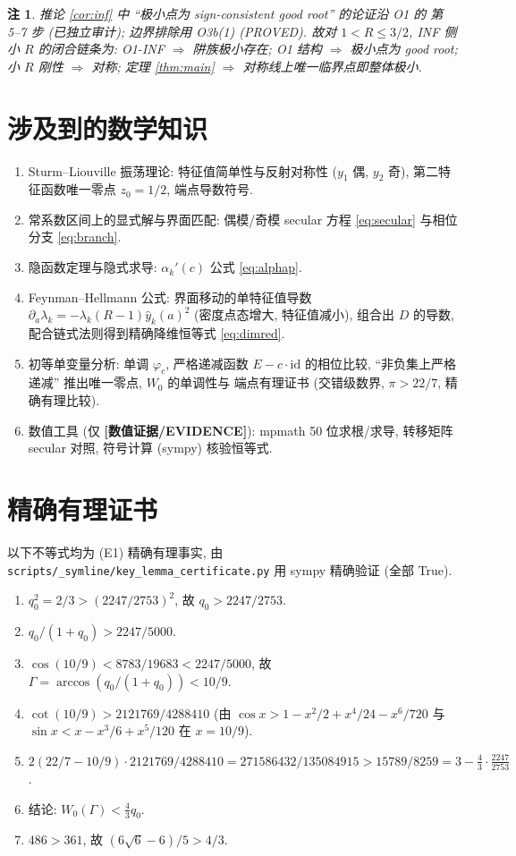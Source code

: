 \documentclass[UTF8]{ctexart}
\newtheorem{remark}[theorem]{注}
\newcommand{\EVID}{\textbf{[数值证据/EVIDENCE]}}
\begin{document}
\begin{remark}
推论 \ref{cor:inf} 中 ``极小点为 sign-consistent good root'' 的论证沿 O1 的
第 5--7 步 (已独立审计); 边界排除用 O3b(1) (PROVED). 故对 $1<R\le3/2$,
INF 侧小 $R$ 的闭合链条为: O1-INF $\Rightarrow$ 阱族极小存在;
O1 结构 $\Rightarrow$ 极小点为 good root; 小 $R$ 刚性 $\Rightarrow$ 对称;
定理 \ref{thm:main} $\Rightarrow$ 对称线上唯一临界点即整体极小.
\end{remark}

\section{涉及到的数学知识}

\begin{enumerate}
	\item Sturm--Liouville 振荡理论: 特征值简单性与反射对称性 ($y_1$ 偶, $y_2$ 奇),
		第二特征函数唯一零点 $z_0=1/2$, 端点导数符号.
	\item 常系数区间上的显式解与界面匹配: 偶模/奇模 secular 方程
		\eqref{eq:secular} 与相位分支 \eqref{eq:branch}.
	\item 隐函数定理与隐式求导: $\alpha_k'(c)$ 公式 \eqref{eq:alphap}.
	\item Feynman--Hellmann 公式: 界面移动的单特征值导数
		$\partial_a\lambda_k=-\lambda_k(R-1)\hat y_k(a)^2$ (密度点态增大, 特征值减小), 组合出 $D$ 的导数,
		配合链式法则得到精确降维恒等式 \eqref{eq:dimred}.
	\item 初等单变量分析: 单调 $\varphi_c$, 严格递减函数 $E-c\cdot\mathrm{id}$
		的相位比较, ``非负集上严格递减'' 推出唯一零点, $W_0$ 的单调性与
		端点有理证书 (交错级数界, $\pi>22/7$, 精确有理比较).
	\item 数值工具 (仅 \EVID{}): mpmath 50 位求根/求导, 转移矩阵 secular 对照,
		符号计算 (sympy) 核验恒等式.
\end{enumerate}

\appendix
\section{精确有理证书}\label{app:cert}

以下不等式均为 (E1) 精确有理事实, 由 \texttt{scripts/\_symline/key\_lemma\_certificate.py}
用 sympy 精确验证 (全部 True).
\begin{enumerate}
	\item $q_0^2=2/3>(2247/2753)^2$, 故 $q_0>2247/2753$.
	\item $q_0/(1+q_0)>2247/5000$.
	\item $\cos(10/9)<8783/19683<2247/5000$, 故 $\Gamma=\arccos(q_0/(1+q_0))<10/9$.
	\item $\cot(10/9)>2121769/4288410$ (由 $\cos x>1-x^2/2+x^4/24-x^6/720$ 与
		$\sin x<x-x^3/6+x^5/120$ 在 $x=10/9$).
	\item $2(22/7-10/9)\cdot2121769/4288410=271586432/135084915>15789/8259
		=3-\frac43\cdot\frac{2247}{2753}$.
	\item 结论: $W_0(\Gamma)<\frac43 q_0$.
	\item $486>361$, 故 $(6\sqrt6-6)/5>4/3$.
\end{enumerate}
\end{document}
